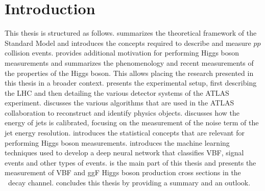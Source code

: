 \chapter{Introduction}
\label{chap:introduction}




\quad \newline

This thesis is structured as follows.  summarizes the theoretical framework of the Standard Model and introduces the concepts required to describe and measure $pp$ collision events.
 provides additional motivation for performing Higgs boson measurements and summarizes the phenomenology and recent measurements of the properties of the Higgs boson. This allows placing the research presented in this thesis in a broader context.
 presents the experimental setup, first describing the LHC and then detailing the various detector systems of the ATLAS experiment.
 discusses the various algorithms that are used in the ATLAS collaboration to reconstruct and identify physics objects.
 discusses how the energy of jets is calibrated, focusing on the measurement of the noise term of the jet energy resolution.
 introduces the statistical concepts that are relevant for performing Higgs boson measurements.
 introduces the machine learning techniques used to develop a deep neural network that classifies VBF, \HWW signal events and other types of events.
 is the main part of this thesis and presents the measurement of VBF and ggF Higgs boson production cross sections in the \HWW\ decay channel.
 concludes this thesis by providing a summary and an outlook.






